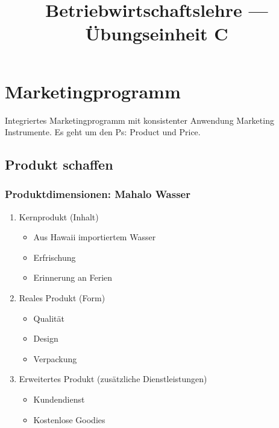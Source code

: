 \documentclass[a4paper]{article}
\title{\textbf{Betriebwirtschaftslehre — Übungseinheit C}}
\begin{document}
    \maketitle
    \section{Marketingprogramm}
    Integriertes Marketingprogramm mit konsistenter Anwendung Marketing Instrumente. Es geht um den Ps: Product und Price.

    \subsection{Produkt schaffen}

    \subsubsection{Produktdimensionen: Mahalo Wasser}
    \begin{enumerate}
        \item Kernprodukt (Inhalt)
        \begin{itemize}
            \item Aus Hawaii importiertem Wasser 
            \item Erfrischung 
            \item Erinnerung an Ferien
        \end{itemize}
        \item Reales Produkt (Form)
              \begin{itemize}
                  \item Qualität
                  \item Design
                  \item Verpackung
              \end{itemize}
        \item Erweitertes Produkt (zusätzliche Dienstleistungen)
              \begin{itemize}
                  \item Kundendienst
                  \item Kostenlose Goodies
              \end{itemize}
    \end{enumerate}
\pagebreak
\end{document}
